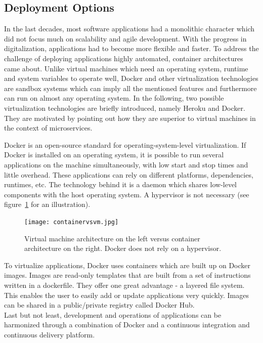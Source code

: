\subsection {Deployment Options}
\label{deploymentoptions}
In the last decades, most software applications had a monolithic character which did not focus much on scalability and agile development. With the progress in digitalization, applications had to become more flexible and faster. To address the challenge of deploying applications highly automated, container architectures came about. Unlike virtual machines which need an operating system, runtime and system variables to operate well, Docker and other virtualization technologies are sandbox systems which can imply all the mentioned features and furthermore can run on almost any operating system. In the following, two possible virtualization technologies are briefly introduced, namely Heroku and Docker. They are motivated by pointing out how they are superior to virtual machines in the context of microservices.~\cite{Wurbs2017Docker2018.}

Docker is an open-source standard for operating-system-level virtualization. If Docker is installed on an operating system, it is possible to run several applications on the machine simultaneously, with low start and stop times and little overhead. These applications can rely on different platforms, dependencies, runtimes, etc. The technology behind it is a daemon which shares low-level components with the host operating system. A hypervisor is not necessary (see figure~\ref{container} for an illustration). 

\begin{figure}[ht]
	\centering
  \texttt{[image: containervsvm.jpg]}
	\caption[Docker vs Virtual Machine Architecture]{Virtual machine architecture on the left versus container architecture on the right. Docker does not rely on a hypervisor.~\cite{Wurbs2017Docker2018.}}
	\label{container}
\end{figure}

To virtualize applications, Docker uses containers which are built up on Docker images. Images are read-only templates that are built from a set of instructions written in a dockerfile. They offer one great advantage - a layered file system. This enables the user to easily add or update applications very quickly. Images can be shared in a public/private registry called Docker Hub. \\
Last but not least, development and operations of applications can be harmonized through a combination of Docker and a continuous integration and continuous delivery platform. 


